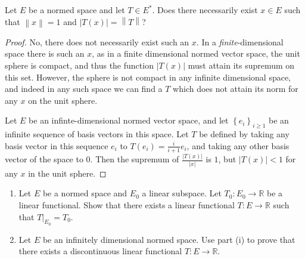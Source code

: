 \documentclass[12pt]{article}
\newcommand{\R}{\mathbb{R}}
\theoremstyle{definition}
\newenvironment{problem}[2][Problem]{\begin{trivlist}
\item[\hskip \labelsep {\bfseries #1}\hskip \labelsep {\bfseries #2.}]}{\end{trivlist}}
\begin{document}
\begin{problem}{4}
	Let $E$ be a normed space and let $T \in E^*$. Does there necessarily exist $x \in E$ such that $\left \lVert {  x } \right \lVert = 1$ and $\left \lvert { T(x) } \right \lvert = \left \lVert { T } \right \lVert $?
\end{problem}
\begin{proof}
		No, there does not necessarily exist such an $x$. In a \textit{finite}-dimensional space there is such an $x$, as in a finite dimensional normed vector space, the unit sphere is compact, and thus the function $\left \lvert { T(x)} \right \lvert $ must attain its supremum on this set. However, the sphere is not compact in any infinite dimensional space, and indeed in any such space we can find a $T$ which does not attain its norm for any $x$ on the unit sphere.
		\par Let $E$ be an infinte-dimensional normed vector space, and let $\left\{ e_i \right\}_{i \geq 1}$ be an infinite sequence of basis vectors in this space. Let $T$ be defined by taking any basis vector in this sequence $e_i$ to $T(e_i) = \frac{i}{i+1} e_i$, and taking any other basis vector of the space to $0$. Then the supremum of $\frac{\left \lvert { T(x) } \right \lvert}{\left \lvert { x } \right \lvert }$ is $1$, but $\left \lvert { T(x) } \right \lvert < 1$ for any $x$ in the unit sphere.
\end{proof}
\begin{problem}{5}
	\begin{enumerate}[label=(\roman*)]
		\item  Let $E$ be a normed space and $E_0$ a linear subspace. Let $T_0: E_0 \to \R$ be a linear functional. Show that there exists a linear functional $T: E \to \R$ such that $T\lvert_{E_0} = T_0$.
		\item Let $E$ be an infinitely dimensional normed space. Use part (i) to prove that there exists a discontinuous linear functional $T : E \to \R$.
	\end{enumerate}
\end{problem}
\end{document}
